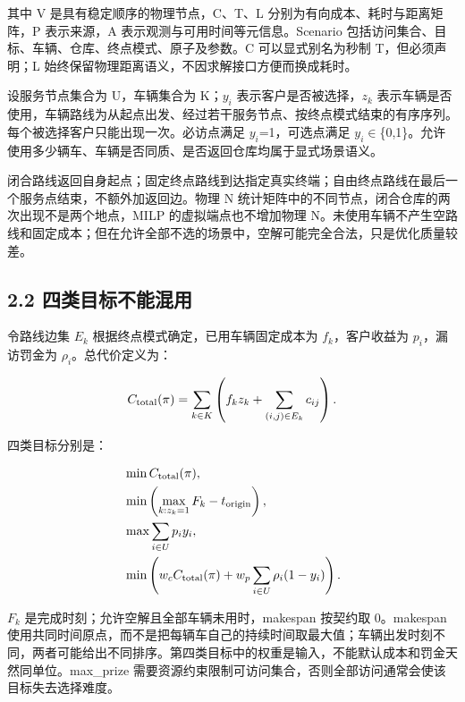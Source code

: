 \documentclass[UTF8,10pt,a4paper,fontset=fandol]{ctexart}
\begin{document}
其中 V 是具有稳定顺序的物理节点，C、T、L 分别为有向成本、耗时与距离矩阵，P 表示来源，A 表示观测与可用时间等元信息。Scenario 包括访问集合、目标、车辆、仓库、终点模式、原子及参数。C 可以显式别名为秒制 T，但必须声明；L 始终保留物理距离语义，不因求解接口方便而换成耗时。


设服务节点集合为 U，车辆集合为 K；\ensuremath{y_{i}} 表示客户是否被选择，\ensuremath{z_{k}} 表示车辆是否使用，车辆路线为从起点出发、经过若干服务节点、按终点模式结束的有序序列。每个被选择客户只能出现一次。必访点满足 \ensuremath{y_{i}}=1，可选点满足 \ensuremath{y_{i}}\ensuremath{\in}\{0,1\}。允许使用多少辆车、车辆是否同质、是否返回仓库均属于显式场景语义。


闭合路线返回自身起点；固定终点路线到达指定真实终端；自由终点路线在最后一个服务点结束，不额外加返回边。物理 N 统计矩阵中的不同节点，闭合仓库的两次出现不是两个地点，MILP 的虚拟端点也不增加物理 N。未使用车辆不产生空路线和固定成本；但在允许全部不选的场景中，空解可能完全合法，只是优化质量较差。


\subsection*{2.2 四类目标不能混用}


令路线边集 \ensuremath{E_{k}} 根据终点模式确定，已用车辆固定成本为 \ensuremath{f_{k}}，客户收益为 \ensuremath{p_{i}}，漏访罚金为 \ensuremath{\rho_{i}}。总代价定义为：


\begin{equation}
C_{\rm total}(\pi)=
\sum_{k\in K}\left(f_kz_k+\sum_{(i,j)\in E_k}c_{ij}\right).
\end{equation}

四类目标分别是：


\begin{equation}
\begin{aligned}
&\min C_{\rm total}(\pi),\\
&\min \left(\max_{k:z_k=1}F_k-t_{\rm origin}\right),\\
&\max \sum_{i\in U}p_iy_i,\\
&\min \left(w_c C_{\rm total}(\pi)+w_p\sum_{i\in U}\rho_i(1-y_i)\right).
\end{aligned}
\end{equation}

\ensuremath{F_{k}} 是完成时刻；允许空解且全部车辆未用时，makespan 按契约取 0。makespan 使用共同时间原点，而不是把每辆车自己的持续时间取最大值；车辆出发时刻不同，两者可能给出不同排序。第四类目标中的权重是输入，不能默认成本和罚金天然同单位。max\_\allowbreak{}prize 需要资源约束限制可访问集合，否则全部访问通常会使该目标失去选择难度。
\end{document}

